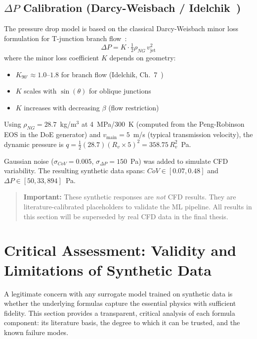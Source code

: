 \documentclass[12pt, a4paper]{report}
\begin{document}
\subsection{$\Delta P$ Calibration (Darcy-Weisbach / Idelchik~\cite{Idelchik1994})}

The pressure drop model is based on the classical Darcy-Weisbach minor loss formulation for T-junction branch flow~\cite{Idelchik1994}:
\begin{equation}
    \Delta P = K \cdot \tfrac{1}{2} \rho_{NG}\, v_{\text{jet}}^2
    \label{eq:dp_syn}
\end{equation}
where the minor loss coefficient $K$ depends on geometry:
\begin{itemize}
    \item $K_{90^\circ} \approx 1.0$--$1.8$ for branch flow (Idelchik, Ch.~7~\cite{Idelchik1994})
    \item $K$ scales with $\sin(\theta)$ for oblique junctions
    \item $K$ increases with decreasing $\beta$ (flow restriction)
\end{itemize}
\noindent Using $\rho_{NG} = 28.7$~kg/m$^3$ at 4~MPa/300~K (computed from the Peng-Robinson EOS in the DoE generator) and $v_{\text{main}} = 5$~m/s (typical transmission velocity), the dynamic pressure is $q = \frac{1}{2}(28.7)(R_v \times 5)^2 = 358.75\,R_v^2$~Pa.

\noindent Gaussian noise ($\sigma_{CoV} = 0.005$, $\sigma_{\Delta P} = 150$~Pa) was added to simulate CFD variability. The resulting synthetic data spans: $CoV \in [0.07, 0.48]$ and $\Delta P \in [50, 33{,}894]$~Pa.

\begin{quote}
\textbf{Important:} These synthetic responses are \textit{not} CFD results. They are literature-calibrated placeholders to validate the ML pipeline. All results in this section will be superseded by real CFD data in the final thesis.
\end{quote}

\section{Critical Assessment: Validity and Limitations of Synthetic Data}

A legitimate concern with any surrogate model trained on synthetic data is whether the underlying formulas capture the essential physics with sufficient fidelity. This section provides a transparent, critical analysis of each formula component: its literature basis, the degree to which it can be trusted, and the known failure modes.
\end{document}
